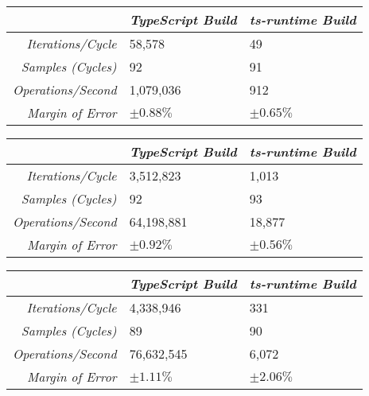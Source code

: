 \begin{center}
{
\centering
\tabulinesep=1.2mm
\setlength{\tabcolsep}{5mm}
\def\arraystretch{1.25}
\small
\begin{tabu} to \textwidth {|r||X[c,m]|X[c,m]|}
  \hline
  & \emph{TypeScript Build} & \emph{ts-runtime Build} \\
  \hline
  \hline
  \emph{Iterations/Cycle}  & 58,578 & 49 \\
  \hline
  \emph{Samples (Cycles)}  & 92 & 91 \\
  \hline
  \emph{Operations/Second} & 1,079,036 & 912 \\
  \hline
  \emph{Margin of Error}   & $\pm 0.88\%$ & $\pm 0.65\%$ \\
  \hline
\end{tabu}
}
\end{center}

\begin{center}
{
\centering
\tabulinesep=1.2mm
\setlength{\tabcolsep}{5mm}
\def\arraystretch{1.25}
\small
\begin{tabu} to \textwidth {|r||X[c,m]|X[c,m]|}
  \hline
  & \emph{TypeScript Build} & \emph{ts-runtime Build} \\
  \hline
  \hline
  \emph{Iterations/Cycle}  & 3,512,823 & 1,013 \\
  \hline
  \emph{Samples (Cycles)}  & 92 & 93 \\
  \hline
  \emph{Operations/Second} & 64,198,881 & 18,877 \\
  \hline
  \emph{Margin of Error}   & $\pm 0.92\%$ & $\pm 0.56\%$ \\
  \hline
\end{tabu}
}
\end{center}

\begin{center}
{
\centering
\tabulinesep=1.2mm
\setlength{\tabcolsep}{5mm}
\def\arraystretch{1.25}
\small
\begin{tabu} to \textwidth {|r||X[c,m]|X[c,m]|}
  \hline
  & \emph{TypeScript Build} & \emph{ts-runtime Build} \\
  \hline
  \hline
  \emph{Iterations/Cycle}  & 4,338,946 & 331 \\
  \hline
  \emph{Samples (Cycles)}  & 89 & 90 \\
  \hline
  \emph{Operations/Second} & 76,632,545 & 6,072 \\
  \hline
  \emph{Margin of Error}   & $\pm 1.11\%$ & $\pm 2.06\%$ \\
  \hline
\end{tabu}
}
\end{center}

